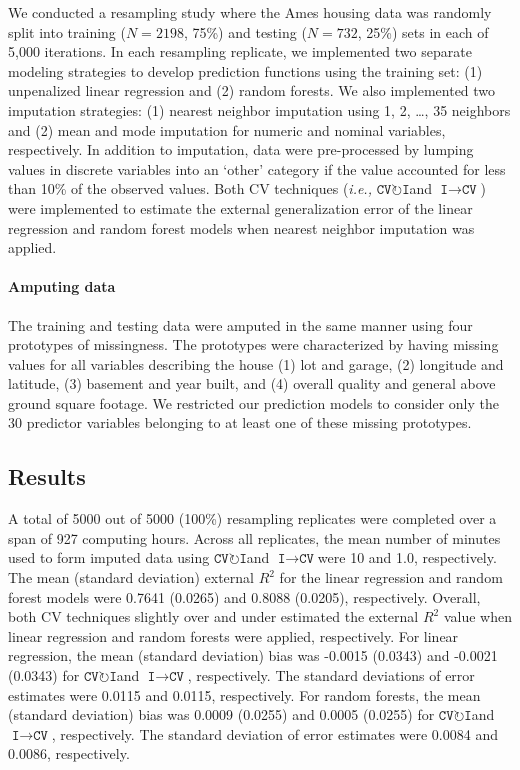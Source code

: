 \documentclass[AMA,STIX1COL,doublespace]{WileyNJD-v2}
\begin{document}
We conducted a resampling study where the Ames housing data was randomly
split into training (\(N = 2198\), 75\%) and testing (\(N = 732\), 25\%)
sets in each of 5,000 iterations. In each resampling replicate, we
implemented two separate modeling strategies to develop prediction
functions using the training set: (1) unpenalized linear regression and
(2) random forests. We also implemented two imputation strategies: (1)
nearest neighbor imputation using 1, 2, \ldots, 35 neighbors and (2)
mean and mode imputation for numeric and nominal variables,
respectively. In addition to imputation, data were pre-processed by
lumping values in discrete variables into an `other' category if the
value accounted for less than 10\% of the observed values. Both CV
techniques
(\textit{i.e., }$\texttt{CV}\!\circlearrowright\!\texttt{I}$\space and
$\texttt{I}\!\!\rightarrow\!\texttt{CV}$) were implemented to estimate
the external generalization error of the linear regression and random
forest models when nearest neighbor imputation was applied.

\paragraph{Amputing data}

The training and testing data were amputed in the same manner using four
prototypes of missingness. The prototypes were characterized by having
missing values for all variables describing the house (1) lot and
garage, (2) longitude and latitude, (3) basement and year built, and (4)
overall quality and general above ground square footage. We restricted
our prediction models to consider only the 30 predictor variables
belonging to at least one of these missing prototypes.

\subsection{Results}

A total of 5000 out of 5000 (100\%) resampling replicates were completed
over a span of 927 computing hours. Across all replicates, the mean
number of minutes used to form imputed data using
$\texttt{CV}\!\circlearrowright\!\texttt{I}$\space and
$\texttt{I}\!\!\rightarrow\!\texttt{CV}$\space were 10 and 1.0,
respectively. The mean (standard deviation) external \(R^2\) for the
linear regression and random forest models were 0.7641 (0.0265) and
0.8088 (0.0205), respectively. Overall, both CV techniques slightly over
and under estimated the external \(R^2\) value when linear regression
and random forests were applied, respectively. For linear regression,
the mean (standard deviation) bias was -0.0015 (0.0343) and -0.0021
(0.0343) for $\texttt{CV}\!\circlearrowright\!\texttt{I}$\space and
$\texttt{I}\!\!\rightarrow\!\texttt{CV}$, respectively. The standard
deviations of error estimates were 0.0115 and 0.0115, respectively. For
random forests, the mean (standard deviation) bias was 0.0009 (0.0255)
and 0.0005 (0.0255) for
$\texttt{CV}\!\circlearrowright\!\texttt{I}$\space and
$\texttt{I}\!\!\rightarrow\!\texttt{CV}$, respectively. The standard
deviation of error estimates were 0.0084 and 0.0086, respectively.
\end{document}
